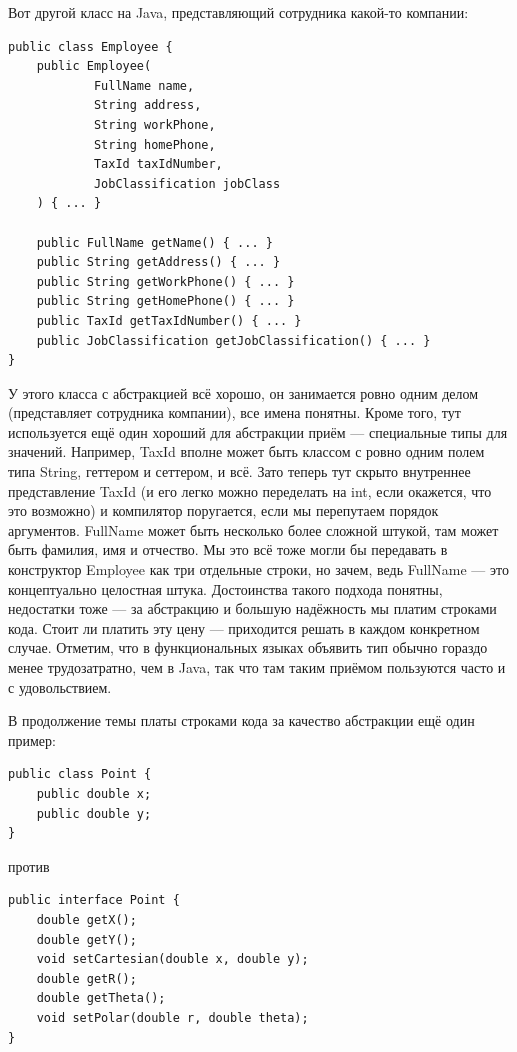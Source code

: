 \documentclass{../text-style}
\begin{document}
Вот другой класс на Java, представляющий сотрудника какой-то компании:

\begin{verbatim}
public class Employee {
    public Employee(
            FullName name,
            String address,
            String workPhone,
            String homePhone,
            TaxId taxIdNumber,
            JobClassification jobClass
    ) { ... }

    public FullName getName() { ... }
    public String getAddress() { ... }
    public String getWorkPhone() { ... }
    public String getHomePhone() { ... }
    public TaxId getTaxIdNumber() { ... }
    public JobClassification getJobClassification() { ... }
}
\end{verbatim}

У этого класса с абстракцией всё хорошо, он занимается ровно одним делом (представляет сотрудника компании), все имена понятны. Кроме того, тут используется ещё один хороший для абстракции приём --- специальные типы для значений. Например, TaxId вполне может быть классом с ровно одним полем типа String, геттером и сеттером, и всё. Зато теперь тут скрыто внутреннее представление TaxId (и его легко можно переделать на int, если окажется, что это возможно) и компилятор поругается, если мы перепутаем порядок аргументов. FullName может быть несколько более сложной штукой, там может быть фамилия, имя и отчество. Мы это всё тоже могли бы передавать в конструктор Employee как три отдельные строки, но зачем, ведь FullName --- это концептуально целостная штука. Достоинства такого подхода понятны, недостатки тоже --- за абстракцию и большую надёжность мы платим строками кода. Стоит ли платить эту цену --- приходится решать в каждом конкретном случае. Отметим, что в функциональных языках объявить тип обычно гораздо менее трудозатратно, чем в Java, так что там таким приёмом пользуются часто и с удовольствием.

В продолжение темы платы строками кода за качество абстракции ещё один пример:

\begin{verbatim}
public class Point {
    public double x;
    public double y;
}
\end{verbatim}

против

\begin{verbatim}
public interface Point {
    double getX();
    double getY();
    void setCartesian(double x, double y);
    double getR();
    double getTheta();
    void setPolar(double r, double theta);
}
\end{verbatim}
\end{document}
